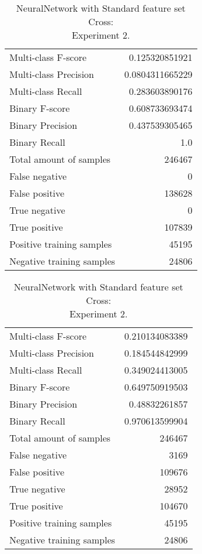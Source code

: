 \begin{table}[H]
\begin{minipage}{0.5\textwidth}
\caption{NeuralNetwork with Standard feature set Cross: \\Experiment 1.}
\centering
\begin{tabular}{l r}
\toprule
Multi-class F-score & 0.125320851921 \\
Multi-class Precision & 0.0804311665229 \\
Multi-class Recall & 0.283603890176 \\
\midrule
Binary F-score & 0.608733693474 \\
Binary Precision & 0.437539305465 \\
Binary Recall & 1.0 \\
\midrule
Total amount of samples & 246467 \\
False negative & 0 \\
False positive & 138628 \\
True negative & 0 \\
True positive & 107839 \\
\midrule
Positive training samples & 45195 \\
Negative training samples & 24806 \\
\bottomrule
\end{tabular}
\end{minipage}
\hfillx
\begin{minipage}{0.5\textwidth}
\caption{NeuralNetwork with Standard feature set Cross: \\Experiment 2.}
\centering
\begin{tabular}{l r}
\toprule
Multi-class F-score & 0.210134083389 \\
Multi-class Precision & 0.184544842999 \\
Multi-class Recall & 0.349024413005 \\
\midrule
Binary F-score & 0.649750919503 \\
Binary Precision & 0.48832261857 \\
Binary Recall & 0.970613599904 \\
\midrule
Total amount of samples & 246467 \\
False negative & 3169 \\
False positive & 109676 \\
True negative & 28952 \\
True positive & 104670 \\
\midrule
Positive training samples & 45195 \\
Negative training samples & 24806 \\
\bottomrule
\end{tabular}
\end{minipage}
\end{table}

